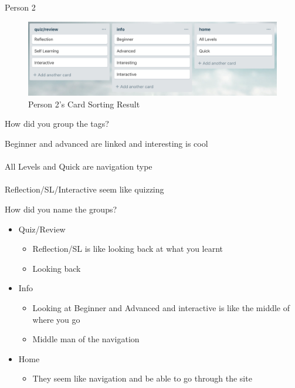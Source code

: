 \begin{note}{Person 2}
	\begin{figure}[H]
		\centering
		\includegraphics[width=\linewidth]{card2}	
		\caption{Person 2's Card Sorting Result}
	\end{figure}

	How did you group the tags?
	\begin{leftbar}
		Beginner and advanced are linked and interesting is cool\\\\
		All Levels and Quick are navigation type\\\\
		Reflection/SL/Interactive seem like quizzing	
	\end{leftbar}
	
	How did you name the groups?
	\begin{leftbar}
		\begin{itemize}
			\item Quiz/Review
			\begin{itemize}
				\item Reflection/SL is like looking back at what you learnt
				\item Looking back
			\end{itemize}
			\item Info
			\begin{itemize}
				\item Looking at Beginner and Advanced and interactive is like the middle of where you go
				\item Middle man of the navigation
			\end{itemize}
			\item Home
			\begin{itemize}
				\item They seem like navigation and be able to go through the site
			\end{itemize}
		\end{itemize}
	\end{leftbar}
\end{note}



